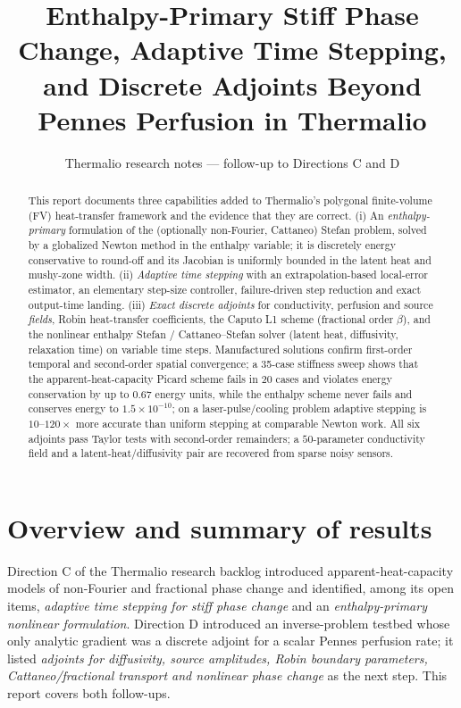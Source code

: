 \documentclass[11pt]{article}
\title{Enthalpy-Primary Stiff Phase Change, Adaptive Time Stepping,\\
and Discrete Adjoints Beyond Pennes Perfusion in Thermalio}
\author{Thermalio research notes --- follow-up to Directions C and D}
\date{}
\numberwithin{equation}{section}
\theoremstyle{remark}
\begin{document}
\maketitle

\begin{abstract}
This report documents three capabilities added to Thermalio's polygonal
finite-volume (FV) heat-transfer framework and the evidence that they are
correct.  (i) An \emph{enthalpy-primary} formulation of the (optionally
non-Fourier, Cattaneo) Stefan problem, solved by a globalized Newton method in
the enthalpy variable; it is discretely energy conservative to round-off and
its Jacobian is uniformly bounded in the latent heat and mushy-zone width.
(ii) \emph{Adaptive time stepping} with an extrapolation-based local-error
estimator, an elementary step-size controller, failure-driven step reduction
and exact output-time landing.  (iii) \emph{Exact discrete adjoints} for
conductivity, perfusion and source \emph{fields}, Robin heat-transfer
coefficients, the Caputo L1 scheme (fractional order $\beta$), and the
nonlinear enthalpy Stefan / Cattaneo--Stefan solver (latent heat, diffusivity,
relaxation time) on variable time steps.  Manufactured solutions confirm
first-order temporal and second-order spatial convergence; a 35-case stiffness
sweep shows that the apparent-heat-capacity Picard scheme fails in 20 cases
and violates energy conservation by up to $0.67$ energy units, while the
enthalpy scheme never fails and conserves energy to $1.5\times10^{-10}$; on a
laser-pulse/cooling problem adaptive stepping is $10$--$120\times$ more accurate
than uniform stepping at comparable Newton work.  All six adjoints pass Taylor tests
with second-order remainders; a $50$-parameter conductivity field and a
latent-heat/diffusivity pair are recovered from sparse noisy sensors.
\end{abstract}

\tableofcontents

\section{Overview and summary of results}

Direction C of the Thermalio research backlog introduced apparent-heat-capacity
models of non-Fourier and fractional phase change and identified, among its
open items, \emph{adaptive time stepping for stiff phase change} and an
\emph{enthalpy-primary nonlinear formulation}.  Direction D introduced an
inverse-problem testbed whose only analytic gradient was a discrete adjoint
for a scalar Pennes perfusion rate; it listed \emph{adjoints for diffusivity,
source amplitudes, Robin boundary parameters, Cattaneo/fractional transport and
nonlinear phase change} as the next step.  This report covers both follow-ups.
\end{document}
